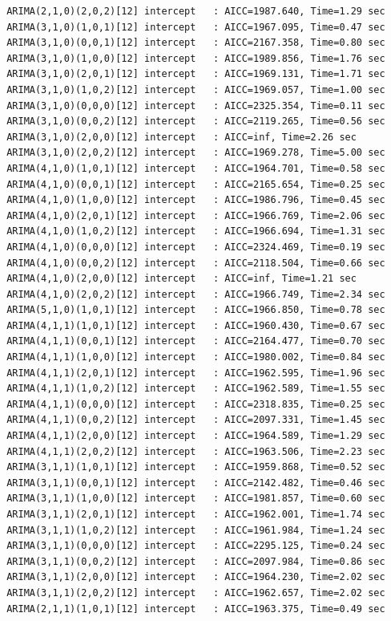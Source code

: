 \documentclass[a4paper, 12pt]{article}
\begin{document}
\begin{verbatim}
 ARIMA(2,1,0)(2,0,2)[12] intercept   : AICC=1987.640, Time=1.29 sec
 ARIMA(3,1,0)(1,0,1)[12] intercept   : AICC=1967.095, Time=0.47 sec
 ARIMA(3,1,0)(0,0,1)[12] intercept   : AICC=2167.358, Time=0.80 sec
 ARIMA(3,1,0)(1,0,0)[12] intercept   : AICC=1989.856, Time=1.76 sec
 ARIMA(3,1,0)(2,0,1)[12] intercept   : AICC=1969.131, Time=1.71 sec
 ARIMA(3,1,0)(1,0,2)[12] intercept   : AICC=1969.057, Time=1.00 sec
 ARIMA(3,1,0)(0,0,0)[12] intercept   : AICC=2325.354, Time=0.11 sec
 ARIMA(3,1,0)(0,0,2)[12] intercept   : AICC=2119.265, Time=0.56 sec
 ARIMA(3,1,0)(2,0,0)[12] intercept   : AICC=inf, Time=2.26 sec
 ARIMA(3,1,0)(2,0,2)[12] intercept   : AICC=1969.278, Time=5.00 sec
 ARIMA(4,1,0)(1,0,1)[12] intercept   : AICC=1964.701, Time=0.58 sec
 ARIMA(4,1,0)(0,0,1)[12] intercept   : AICC=2165.654, Time=0.25 sec
 ARIMA(4,1,0)(1,0,0)[12] intercept   : AICC=1986.796, Time=0.45 sec
 ARIMA(4,1,0)(2,0,1)[12] intercept   : AICC=1966.769, Time=2.06 sec
 ARIMA(4,1,0)(1,0,2)[12] intercept   : AICC=1966.694, Time=1.31 sec
 ARIMA(4,1,0)(0,0,0)[12] intercept   : AICC=2324.469, Time=0.19 sec
 ARIMA(4,1,0)(0,0,2)[12] intercept   : AICC=2118.504, Time=0.66 sec
 ARIMA(4,1,0)(2,0,0)[12] intercept   : AICC=inf, Time=1.21 sec
 ARIMA(4,1,0)(2,0,2)[12] intercept   : AICC=1966.749, Time=2.34 sec
 ARIMA(5,1,0)(1,0,1)[12] intercept   : AICC=1966.850, Time=0.78 sec
 ARIMA(4,1,1)(1,0,1)[12] intercept   : AICC=1960.430, Time=0.67 sec
 ARIMA(4,1,1)(0,0,1)[12] intercept   : AICC=2164.477, Time=0.70 sec
 ARIMA(4,1,1)(1,0,0)[12] intercept   : AICC=1980.002, Time=0.84 sec
 ARIMA(4,1,1)(2,0,1)[12] intercept   : AICC=1962.595, Time=1.96 sec
 ARIMA(4,1,1)(1,0,2)[12] intercept   : AICC=1962.589, Time=1.55 sec
 ARIMA(4,1,1)(0,0,0)[12] intercept   : AICC=2318.835, Time=0.25 sec
 ARIMA(4,1,1)(0,0,2)[12] intercept   : AICC=2097.331, Time=1.45 sec
 ARIMA(4,1,1)(2,0,0)[12] intercept   : AICC=1964.589, Time=1.29 sec
 ARIMA(4,1,1)(2,0,2)[12] intercept   : AICC=1963.506, Time=2.23 sec
 ARIMA(3,1,1)(1,0,1)[12] intercept   : AICC=1959.868, Time=0.52 sec
 ARIMA(3,1,1)(0,0,1)[12] intercept   : AICC=2142.482, Time=0.46 sec
 ARIMA(3,1,1)(1,0,0)[12] intercept   : AICC=1981.857, Time=0.60 sec
 ARIMA(3,1,1)(2,0,1)[12] intercept   : AICC=1962.001, Time=1.74 sec
 ARIMA(3,1,1)(1,0,2)[12] intercept   : AICC=1961.984, Time=1.24 sec
 ARIMA(3,1,1)(0,0,0)[12] intercept   : AICC=2295.125, Time=0.24 sec
 ARIMA(3,1,1)(0,0,2)[12] intercept   : AICC=2097.984, Time=0.86 sec
 ARIMA(3,1,1)(2,0,0)[12] intercept   : AICC=1964.230, Time=2.02 sec
 ARIMA(3,1,1)(2,0,2)[12] intercept   : AICC=1962.657, Time=2.02 sec
 ARIMA(2,1,1)(1,0,1)[12] intercept   : AICC=1963.375, Time=0.49 sec

\end{verbatim}
\end{document}
